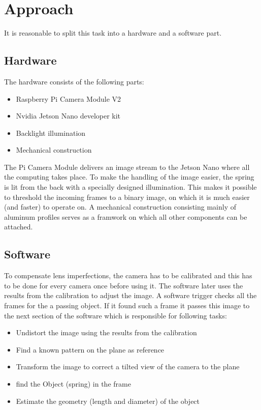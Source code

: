 \section{Approach}
It is reasonable to split this task into a hardware and a software part.

\subsection{Hardware}
The hardware consists of the following parts:
\begin{itemize}
	\item Raspberry Pi Camera Module V2
	\item Nvidia Jetson Nano developer kit
	\item Backlight illumination
	\item Mechanical construction
\end{itemize}
The Pi Camera Module delivers an image stream to the Jetson Nano where all the computing takes place.
To make the handling of the image easier, the spring is lit from the back with a specially designed illumination.
This makes it possible to threshold the incoming frames to a binary image, on which it is much easier (and faster) to operate on.
A mechanical construction consisting mainly of aluminum profiles serves as a framwork on which all other components can be attached.

\subsection{Software}
To compensate lens imperfections, the camera has to be calibrated and this has to be done for every camera once before using it.
The software later uses the results from the calibration to adjust the image.
A software trigger checks all the frames for the a passing object.
If it found such a frame it passes this image to the next section of the software which is responsible for following tasks:
\begin{itemize}
	\item Undistort the image using the results from the calibration
	\item Find a known pattern on the plane as reference
	\item Transform the image to correct a tilted view of the camera to the plane
	\item find the Object (spring) in the frame
	\item Estimate the geometry (length and diameter) of the object
\end{itemize} 

